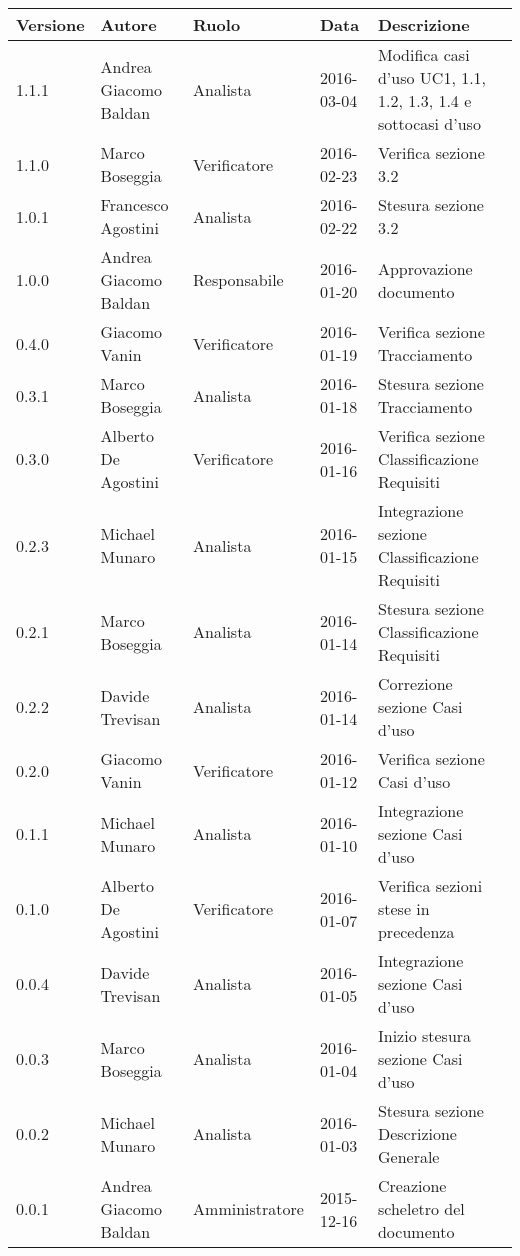\documentclass{scalatekids-article}
\begin{document}
\begin{center}
  \begin{tabular}{| l | l | l | l | p{5cm} |}
    \hline
    Versione & Autore & Ruolo & Data & Descrizione \\
    \hline
    1.1.1 & Andrea Giacomo Baldan & Analista & 2016-03-04 & Modifica casi d'uso UC1, 1.1, 1.2, 1.3, 1.4 e sottocasi d'uso\\
    \hline
    1.1.0 & Marco Boseggia & Verificatore & 2016-02-23 & Verifica sezione 3.2\\
    \hline
    1.0.1 & Francesco Agostini & Analista & 2016-02-22 & Stesura sezione 3.2\\
    \hline
    1.0.0 & Andrea Giacomo Baldan & Responsabile & 2016-01-20 & Approvazione documento\\
    \hline
    0.4.0 & Giacomo Vanin & Verificatore & 2016-01-19 & Verifica sezione Tracciamento\\
    \hline
    0.3.1 & Marco Boseggia & Analista & 2016-01-18 & Stesura sezione Tracciamento\\
    \hline
    0.3.0 & Alberto De Agostini & Verificatore & 2016-01-16 & Verifica sezione Classificazione Requisiti\\
    \hline
    0.2.3 & Michael Munaro & Analista & 2016-01-15 & Integrazione sezione Classificazione Requisiti\\
    \hline
    0.2.1 & Marco Boseggia & Analista & 2016-01-14 & Stesura sezione Classificazione Requisiti\\
    \hline
    0.2.2 & Davide Trevisan & Analista & 2016-01-14 & Correzione sezione Casi d'uso\\
    \hline
    0.2.0 & Giacomo Vanin & Verificatore & 2016-01-12 & Verifica sezione Casi d'uso\\
    \hline
    0.1.1 & Michael Munaro & Analista & 2016-01-10 & Integrazione sezione Casi d'uso\\
    \hline
    0.1.0 & Alberto De Agostini & Verificatore & 2016-01-07 & Verifica sezioni stese in precedenza\\
    \hline
    0.0.4 & Davide Trevisan & Analista & 2016-01-05 & Integrazione sezione Casi d'uso\\
    \hline
    0.0.3 & Marco Boseggia & Analista & 2016-01-04 & Inizio stesura sezione Casi d'uso\\
    \hline
    0.0.2 & Michael Munaro & Analista & 2016-01-03 & Stesura sezione Descrizione Generale\\
    \hline
    0.0.1 & Andrea Giacomo Baldan & Amministratore & 2015-12-16 & Creazione scheletro del documento\\
    \hline
  \end{tabular}
\end{center}
\tableofcontents
\newpage
{}
\end{document}
